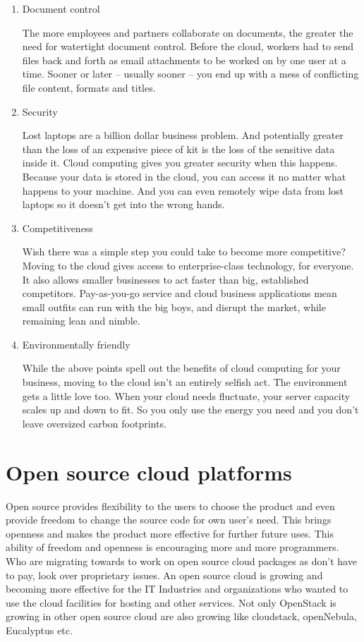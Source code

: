 \begin{enumerate}
    \item Document control
    \par The more employees and partners collaborate on documents, the greater the need for watertight document control. Before the cloud, workers had to send files back and forth as email attachments to be worked on by one user at a time. Sooner or later – usually sooner – you end up with a mess of conflicting file content, formats and titles\cite{ben}.
    
    \item Security
    \par Lost laptops are a billion dollar business problem. And potentially greater than the loss of an expensive piece of kit is the loss of the sensitive data inside it. Cloud computing gives you greater security when this happens. Because your data is stored in the cloud, you can access it no matter what happens to your machine. And you can even remotely wipe data from lost laptops so it doesn’t get into the wrong hands\cite{ben}.
    
    \item Competitiveness
    \par Wish there was a simple step you could take to become more competitive? Moving to the cloud gives access to enterprise-class technology, for everyone. It also allows smaller businesses to act faster than big, established competitors. Pay-as-you-go service and cloud business applications mean small outfits can run with the big boys, and disrupt the market, while remaining lean and nimble\cite{ben}.
    
    \item Environmentally friendly
    \par While the above points spell out the benefits of cloud computing for your business, moving to the cloud isn’t an entirely selfish act. The environment gets a little love too. When your cloud needs fluctuate, your server capacity scales up and down to fit. So you only use the energy you need and you don’t leave oversized carbon footprints\cite{ben}.
    
    \end{enumerate}
    
    \section{Open source cloud platforms}
    
    Open source provides flexibility to the users to choose the product and even provide freedom to change the source code for own user's need. This brings openness and makes the product more effective for further future uses. This ability of freedom and openness is encouraging more and more programmers. Who are migrating towards to work on open source cloud packages as don't have to pay, look over proprietary issues. An open source cloud is growing and becoming more effective for the IT Industries and organizations who wanted to use the cloud facilities for hosting and other services. Not only OpenStack is growing in other open source cloud are also growing like cloudstack, openNebula, Eucalyptus etc.
    
